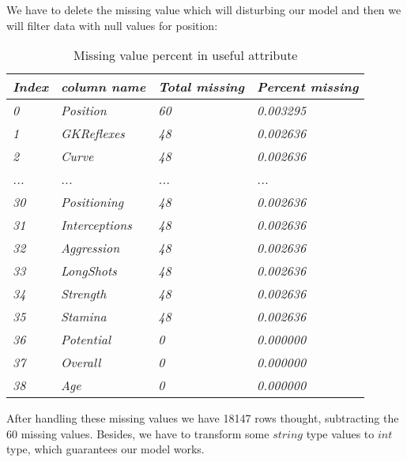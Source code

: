 \documentclass{article}
\begin{document}
We have to delete the missing value which will disturbing our model and then we will filter data with null values for position:
\\
\clearpage
\begin{table}[]
\centering
\begin{tabular}{|l|l|l|l|}
\hline
\textit{Index} & \textit{column name}   & \textit{Total missing} & \textit{Percent missing} \\ \hline
\textit{0}     & \textit{Position}      & \textit{60}            & \textit{0.003295}        \\ \hline
\textit{1}     & \textit{GKReflexes}    & \textit{48}            & \textit{0.002636}        \\ \hline
\textit{2}     & \textit{Curve}         & \textit{48}            & \textit{0.002636}        \\ \hline
\textit{...}   & \textit{...}           & \textit{...}           & \textit{...}             \\ \hline
\textit{30}    & \textit{Positioning}   & \textit{48}            & \textit{0.002636}        \\ \hline
\textit{31}    & \textit{Interceptions} & \textit{48}            & \textit{0.002636}        \\ \hline
\textit{32}    & \textit{Aggression}    & \textit{48}            & \textit{0.002636}        \\ \hline
\textit{33}    & \textit{LongShots}     & \textit{48}            & \textit{0.002636}        \\ \hline
\textit{34}    & \textit{Strength}      & \textit{48}            & \textit{0.002636}        \\ \hline
\textit{35}    & \textit{Stamina}       & \textit{48}            & \textit{0.002636}        \\ \hline
\textit{36}    & \textit{Potential}     & \textit{0}             & \textit{0.000000}        \\ \hline
\textit{37}    & \textit{Overall}       & \textit{0}             & \textit{0.000000}        \\ \hline
\textit{38}    & \textit{Age}           & \textit{0}             & \textit{0.000000}        \\ \hline
\end{tabular}
\caption{Missing value percent in useful attribute}
\end{table}

After handling these missing values we have 18147 rows thought, subtracting the 60 missing values.
Besides, we have to transform some $string$ type values to $int$ type, which guarantees our model works. 
\end{document}
